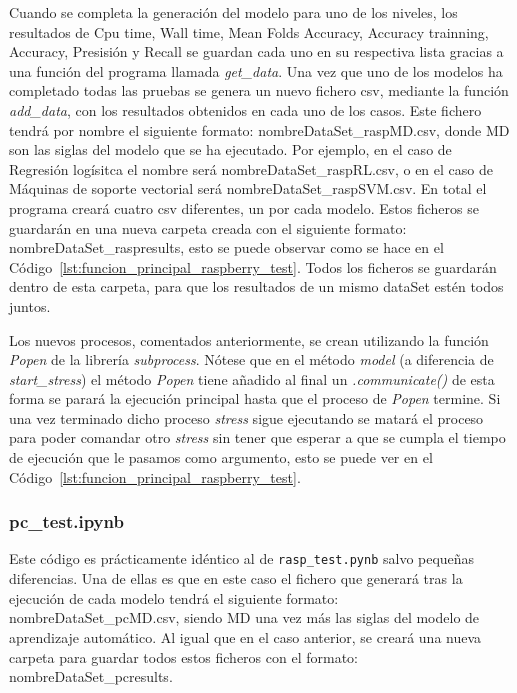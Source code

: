 \documentclass[a4paper, 12pt]{book}
\begin{document}
Cuando se completa la generación del modelo para uno de los niveles, los resultados de Cpu time, Wall time, Mean Folds Accuracy, Accuracy trainning, Accuracy, Presisión y Recall se guardan cada uno en su respectiva lista gracias a una función del programa llamada \textit{get\_data}. Una vez que uno de los modelos ha completado todas las pruebas se genera un nuevo fichero csv, mediante la función \textit{add\_data}, con los resultados obtenidos en cada uno de los casos.
Este fichero tendrá por nombre el siguiente formato: nombreDataSet\_raspMD.csv, donde MD son las siglas del modelo que se ha ejecutado. Por ejemplo, en el caso de Regresión logísitca el nombre será nombreDataSet\_raspRL.csv, o en el caso de Máquinas de soporte vectorial será nombreDataSet\_raspSVM.csv. En total el programa creará cuatro csv diferentes, un por cada modelo. Estos ficheros se guardarán en una nueva carpeta creada con el siguiente formato: nombreDataSet\_raspresults, esto se puede observar como se hace en el Código~\ref{lst:funcion_principal_raspberry_test}. Todos los ficheros se guardarán dentro de esta carpeta, para que los resultados de un mismo dataSet estén todos juntos.

Los nuevos procesos, comentados anteriormente, se crean utilizando la función \textit{Popen} de la librería \textit{subprocess}. Nótese que en el método \textit{model} (a diferencia de \textit{start\_stress}) el método \textit{Popen} tiene añadido al final un \textit{.communicate()} de esta forma se parará la ejecución principal hasta que el proceso de \textit{Popen} termine. Si una vez terminado dicho proceso \textit{stress} sigue ejecutando se matará el proceso para poder comandar otro \textit{stress} sin tener que esperar a que se cumpla el tiempo de ejecución que le pasamos como argumento, esto se puede ver en el Código~\ref{lst:funcion_principal_raspberry_test}.

\subsubsection{pc\_test.ipynb}
\label{subsubsec:programa_pruebas_pc}

Este código es prácticamente idéntico al de \texttt{rasp\_test.pynb} salvo pequeñas diferencias. Una de ellas es que en este caso el fichero que generará tras la ejecución de cada modelo tendrá el siguiente formato: nombreDataSet\_pcMD.csv, siendo MD una vez más las siglas del modelo de aprendizaje automático. Al igual que en el caso anterior, se creará una nueva carpeta para guardar todos estos ficheros con el formato: nombreDataSet\_pcresults.
\end{document}
